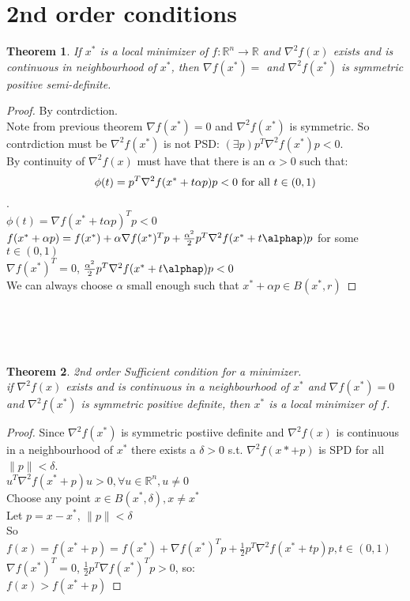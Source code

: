 \documentclass[12pt,letter]{article}
\newcommand{\R}{\mathbb{R}}
\newcommand{\norm}[1]{\|#1\|}
\newtheorem{theorem}{Theorem}[section]
\begin{document}

\section{2nd order conditions}

\begin{theorem}
  If $x^*$ is a local minimizer of $f:\R^n\to\R$ and $\nabla^2f(x)$ exists and is continuous in neighbourhood of $x^*$, then $\nabla f(x^*)=$ and $\nabla^2 f(x^*)$ is symmetric positive semi-definite.
\end{theorem}

\begin{proof}
  By contrdiction.\\
  Note from previous theorem $\nabla f(x^*)=0$ and $\nabla^2 f(x^*)$ is symmetric. So contrdiction must be $\nabla^2 f(x^*)$ is not PSD: $(\exists p) p^T\nabla^2 f(x^*)p <0$.\\
  
  By continuity of $\nabla^2 f(x)$ must have that there is an $\alpha>0$ such that:\\
  \[\phi(t)=p^T \nabla^2 f(x^*+t\alpha p)p <0$ for all $t\in(0,1)\].\\
  $\phi(t)=\nabla f(x^*+t\alpha p)^Tp<0$\\
  $f(x^*+\alpha p)=f(x^*)+\alpha \nabla f(x^*)^Tp + \frac{\alpha^2}{2}p^T \nabla^2 f(x^*+t \alphap)p$ for some $t\in(0,1)$\\
  $\nabla f(x^*)^T=0$, $\frac{\alpha^2}{2}p^T \nabla^2 f(x^*+t \alphap)p<0$\\
  We can always choose $\alpha$ small enough such that $x^*+\alpha p\in B(x^*,r)$
\end{proof}\\

\\\\


\begin{theorem}
  2nd order Sufficient condition for a minimizer.\\
  if $\nabla^2 f(x)$ exists and is continuous in a neighbourhood of $x^*$ and $\nabla f(x^*)=0$ and $\nabla^2 f(x^*)$ is symmetric positive definite, then $x^*$ is a local minimizer of $f$.
\end{theorem}
\begin{proof}
  Since $\nabla^2 f(x^*)$ is symmetric postiive definite and $\nabla^2 f(x)$ is continuous in a neighbourhood of $x^*$ there exists a $\delta>0$ s.t. $\nabla^2 f(x*+p)$ is SPD for all $\norm{p}<\delta$.\\
  $u^T \nabla^2 f(x^*+p) u > 0, \forall u \in \R^n, u\not=0$\\
  Choose any point $x\in B(x^*,\delta),x\not=x^*$\\
  Let $p=x-x^*$, $\norm{p}<\delta$\\
  So $f(x)=f(x^*+p)=f(x^*)+\nabla f(x^*)^Tp+\frac{1}{2}p^T\nabla^2 f(x^*+tp)p, t\in(0,1)$\\
  $\nabla f(x^*)^T=0$, $\frac{1}{2}p^T\nabla f(x^*)^Tp>0$, so:\\
  $f(x)>f(x^*+p)$
\end{proof}
\end{document}
